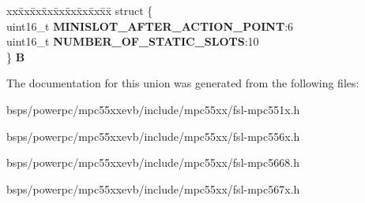 \begin{DoxyCompactItemize}
\begin{tabbing}
\end{tabbing}\item 
\mbox{\label{unionuPCR2_a9df98af9865a99585df93025cb359dcb}} 
\begin{tabbing}
xx\=xx\=xx\=xx\=xx\=xx\=xx\=xx\=xx\=\kill
struct \{\\
\>uint16\_t {\bfseries MINISLOT\_AFTER\_ACTION\_POINT}:6\\
\>uint16\_t {\bfseries NUMBER\_OF\_STATIC\_SLOTS}:10\\
\} {\bfseries B}\\

\end{tabbing}\end{DoxyCompactItemize}


The documentation for this union was generated from the following files\+:\begin{DoxyCompactItemize}
\item 
bsps/powerpc/mpc55xxevb/include/mpc55xx/fsl-\/mpc551x.\+h\item 
bsps/powerpc/mpc55xxevb/include/mpc55xx/fsl-\/mpc556x.\+h\item 
bsps/powerpc/mpc55xxevb/include/mpc55xx/fsl-\/mpc5668.\+h\item 
bsps/powerpc/mpc55xxevb/include/mpc55xx/fsl-\/mpc567x.\+h\end{DoxyCompactItemize}
